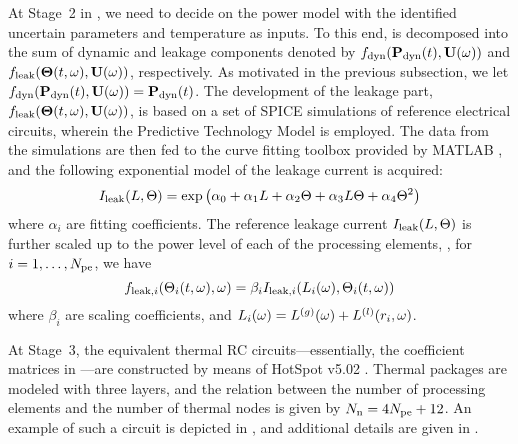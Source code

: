 At Stage~2 in , we need to decide on the power model with the identified uncertain parameters and temperature as inputs. To this end,  is decomposed into the sum of dynamic and leakage components denoted by $f_{\text{dyn}}(\mathbf{P}_{\text{dyn}}(t), \mathbf{U}(\omega))$ and $f_{\text{leak}}({\boldsymbol\Theta}(t, \omega), \mathbf{U}(\omega))$, respectively. As motivated in the previous subsection, we let $f_{\text{dyn}}(\mathbf{P}_{\text{dyn}}(t), \mathbf{U}(\omega)) = \mathbf{P}_{\text{dyn}}(t)$. The development of the leakage part, $f_{\text{leak}}({\boldsymbol\Theta}(t, \omega), \mathbf{U}(\omega))$, is based on a set of SPICE simulations of reference electrical circuits, wherein the Predictive Technology Model \cite{ptm} is employed. The data from the simulations are then fed to the curve fitting toolbox provided by MATLAB \cite{matlab}, and the following exponential model of the leakage current is acquired:
\begin{equation} \elabel{leakage-current}
  I_\leak(\Leff, \T) = \exp \left( \alpha_0 + \alpha_1 \Leff + \alpha_2 \T + \alpha_3 \Leff \T + \alpha_4 \T^2 \right)
\end{equation}
where $\alpha_i$ are fitting coefficients. The reference leakage current $I_{\text{leak}}(L, \Theta)$ is further scaled up to the power level of each of the processing elements, \ie, for $i = 1, \dotsc, {N_\text{pe}}$, we have
\[
  f_{\text{leak}, i}(\Theta_i(t, \omega), \omega) = \beta_i I_{\text{leak}, i}(L_i(\omega), \Theta_i(t, \omega))
\]
where $\beta_i$ are scaling coefficients, and $L_i(\omega) = {L^{(g)}}(\omega) + L^{(l)}(r_i, \omega)$.

At Stage~3, the equivalent thermal RC circuits---essentially, the coefficient matrices in ---are constructed by means of HotSpot v5.02 \cite{hotspot}. Thermal packages are modeled with three layers, and the relation between the number of processing elements and the number of thermal nodes is given by $N_\text{n} = 4 {N_\text{pe}} + 12$. An example of such a circuit is depicted in , and additional details are given in .
